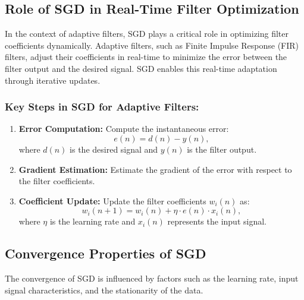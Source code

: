 \documentclass[hidelinks,12pt]{article}
\begin{document}
	\subsection*{Role of SGD in Real-Time Filter Optimization}
	In the context of adaptive filters, SGD plays a critical role in optimizing filter coefficients dynamically. Adaptive filters, such as Finite Impulse Response (FIR) filters, adjust their coefficients in real-time to minimize the error between the filter output and the desired signal. SGD enables this real-time adaptation through iterative updates.
	
	\subsubsection*{Key Steps in SGD for Adaptive Filters:}
	\begin{enumerate}
		\item \textbf{Error Computation:} Compute the instantaneous error:
		\[
		e(n) = d(n) - y(n),
		\]
		where \( d(n) \) is the desired signal and \( y(n) \) is the filter output.
		
		\item \textbf{Gradient Estimation:} Estimate the gradient of the error with respect to the filter coefficients.
		
		\item \textbf{Coefficient Update:} Update the filter coefficients \( w_i(n) \) as:
		\[
		w_i(n+1) = w_i(n) + \eta \cdot e(n) \cdot x_i(n),
		\]
		where \( \eta \) is the learning rate and \( x_i(n) \) represents the input signal.
	\end{enumerate}
	
	\subsection*{Convergence Properties of SGD}
	The convergence of SGD is influenced by factors such as the learning rate, input signal characteristics, and the stationarity of the data.
	
\end{document}
